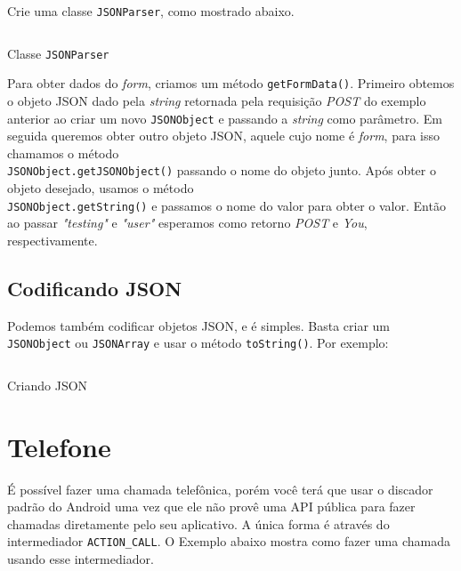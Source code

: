 \documentclass[a4paper,12pt,brazil,oneside]{book}
\begin{document}
\begin{singlespace}
		Crie uma classe \texttt{JSONParser}, como mostrado abaixo.
		
		\begin{listing}[H]
		\inputminted[linenos=true,fontsize=\small,frame=lines, framesep=2mm, tabsize=2,numbersep=5pt]{java}{src/api/comm/jsonparser.java}
		\caption{Classe \texttt{JSONParser}}
		\label{code:jsonparser}
		\end{listing} 

		Para obter dados do \emph{form}, criamos um método \texttt{getFormData()}. Primeiro obtemos o objeto JSON dado pela \emph{string} retornada pela requisição \emph{POST} do exemplo anterior ao criar um novo \texttt{JSONObject} e passando a \emph{string} como parâmetro. Em seguida queremos obter outro objeto JSON, aquele cujo nome é \emph{form}, para isso chamamos o método \\ \texttt{JSONObject.getJSONObject()} passando o nome do objeto junto. Após obter o objeto desejado, usamos o método \\ \texttt{JSONObject.getString()} e passamos o nome do valor para obter o valor. Então ao passar \emph{"testing"} e \emph{"user"} esperamos como retorno \emph{POST} e \emph{You}, respectivamente. 

		\subsection{Codificando JSON}

		Podemos também codificar objetos JSON, e é simples. Basta criar um \texttt{JSONObject} ou \texttt{JSONArray} e usar o método \texttt{toString()}. Por exemplo:
	
		\begin{listing}[H]
		\inputminted[linenos=true,fontsize=\small,frame=lines, framesep=2mm, tabsize=2,numbersep=5pt]{java}{src/api/comm/writejson.java}
		\caption{Criando JSON}
		\label{code:jsonparser2}
		\end{listing} 


	\section{Telefone}
		
		É possível fazer uma chamada telefônica, porém você terá que usar o discador padrão do Android uma vez que ele não provê uma API pública para fazer chamadas diretamente pelo seu aplicativo. A única forma é através do intermediador \texttt{ACTION\_CALL}. O Exemplo abaixo mostra como fazer uma chamada usando esse intermediador.


\end{singlespace}
\end{document}
